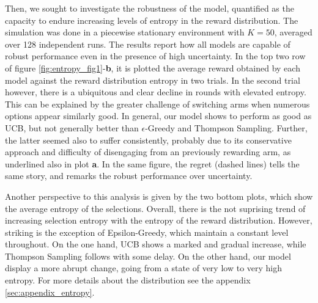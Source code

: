 \noindent Then, we sought to investigate the robustness of the model, quantified as the capacity to endure increasing levels of entropy in the reward distribution.
The simulation was done in a piecewise stationary environment with $K=50$, averaged over 128 independent runs.
The results report how all models are capable of robust performance even in the presence of high uncertainty.
In the top two row of figure \ref{fig:entropy_fig1}-\textbf{b}, it is plotted the average reward obtained by each model against the reward distribution entropy in two trials.
In the second trial however, there is a ubiquitous and clear decline in rounds with elevated entropy. This can be explained by the greater challenge of switching arms when numerous options appear similarly good.
In general, our model shows to perform as good as UCB, but not generally better than $\epsilon$-Greedy and Thompson Sampling.
Further, the latter seemed also to suffer consistently, probably due to its conservative approach and difficulty of disengaging from an previously rewarding arm, as underlined also in plot \textbf{a}.
In the same figure, the regret (dashed lines) tells the same story, and remarks the robust performance over uncertainty.

Another perspective to this analysis is given by the two bottom plots, which show the average entropy of the selections.
Overall, there is the not suprising trend of increasing selection entropy with the entropy of the reward distribution. However, striking is the exception of Epsilon-Greedy, which maintain a constant level throughout.
On the one hand, UCB shows a marked and gradual increase, while Thompson Sampling follows with some delay.
On the other hand, our model display a more abrupt change, going from a state of very low to very high entropy.
For more details about the distribution see the appendix \ref{sec:appendix_entropy}.






